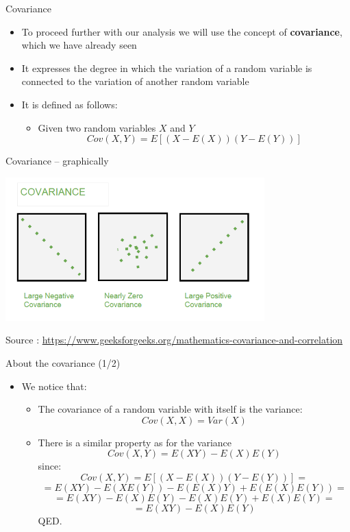 \documentclass{beamer}
\begin{document}
\begin{frame}
{\centerline{Covariance}}

\begin{itemize}
\item To proceed further with our analysis we will use the concept of \textbf{covariance}, which we have already seen
\item It expresses the degree in which the variation of a random variable is connected to the variation of another random variable
\item It is defined as follows:
\begin{itemize}
\item Given two random variables $X$ and $Y$
$$Cov(X,Y) = E[ (X - E(X))(Y - E(Y))]$$
\end{itemize}
\end{itemize}

\end{frame}


\begin{frame}
{\centerline{Covariance -- graphically}}


\begin{center}
\includegraphics[width=10cm]{P2023.AIBCCSS.FoundationsDataScience/Covar.png}
\end{center} 
\begin{center}
\tiny 
Source : \url{https://www.geeksforgeeks.org/mathematics-covariance-and-correlation}
\end{center}

\end{frame}


\begin{frame}
{\centerline{About the covariance (1/2)}}

\begin{itemize}
\item We notice that:
\begin{itemize}
\item The covariance of a random variable with itself is the variance:
$$Cov(X,X) = Var(X)$$
\item There is a similar property as for the variance
$$Cov(X,Y) = E(XY) - E(X)E(Y)$$
since:
$$Cov(X,Y) = E[ (X - E(X))(Y - E(Y))] = $$
$$ = E(XY) - E(XE(Y)) - E(E(X)Y) + E(E(X)E(Y)) =$$
$$ = E(XY) - E(X)E(Y) - E(X)E(Y) + E(X)E(Y) = $$
$$ = E(XY) - E(X)E(Y)$$
QED.


\end{itemize}


\end{itemize}

\end{frame}
\end{document}
